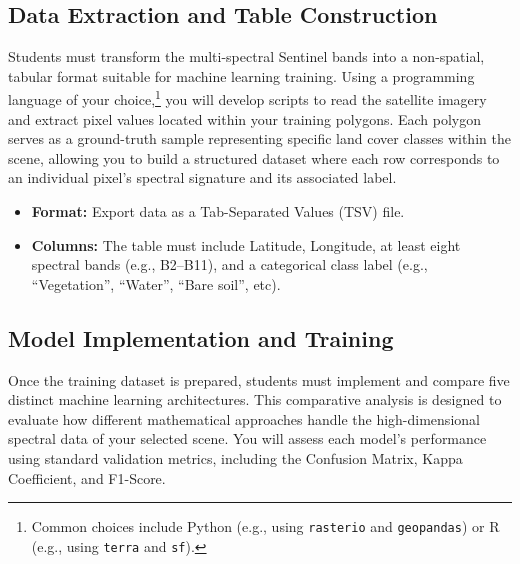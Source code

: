 \documentclass{article}
\begin{document}
\subsection{Data Extraction and Table Construction}
Students must transform the multi-spectral Sentinel bands into a non-spatial, tabular format suitable for machine learning training. Using a programming language of your choice,\footnote{Common choices include Python (e.g., using \texttt{rasterio} and \texttt{geopandas}) or R (e.g., using \texttt{terra} and \texttt{sf}).} you will develop scripts to read the satellite imagery and extract pixel values located within your training polygons. Each polygon serves as a ground-truth sample representing specific land cover classes within the scene, allowing you to build a structured dataset where each row corresponds to an individual pixel's spectral signature and its associated label.

\begin{itemize}
    \item \textbf{Format:} Export data as a Tab-Separated Values (TSV) file.

    \item \textbf{Columns:} The table must include Latitude, Longitude, at least eight spectral bands (e.g., B2--B11), and a categorical class label (e.g., ``Vegetation'', ``Water'', ``Bare soil'', etc).
\end{itemize}

\subsection{Model Implementation and Training}
Once the training dataset is prepared, students must implement and compare five distinct machine learning architectures. This comparative analysis is designed to evaluate how different mathematical approaches handle the high-dimensional spectral data of your selected scene. You will assess each model's performance using standard validation metrics, including the Confusion Matrix, Kappa Coefficient, and F1-Score.
\end{document}
